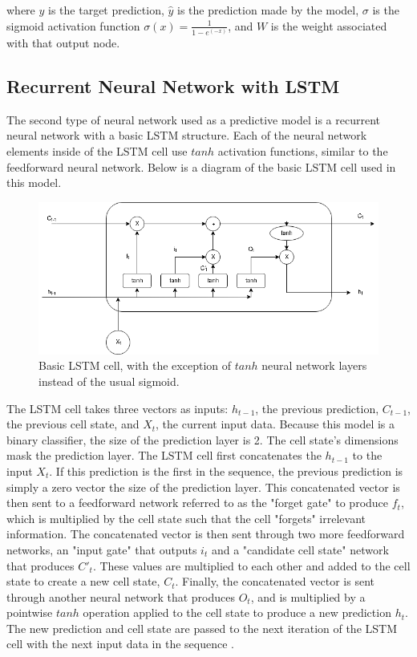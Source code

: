\documentclass{article}
\begin{document}
where $y$ is the target prediction, $\hat y$ is the prediction made by the model, $\sigma$ is the sigmoid activation function $\sigma(x) = \frac{1}{1-e^(-x)}$, and $W$ is the weight associated with that output node.
\subsection{Recurrent Neural Network with LSTM}
The second type of neural network used as a predictive model is a recurrent neural network with a basic LSTM structure. Each of the neural network elements inside of the LSTM cell use $tanh$ activation functions, similar to the feedforward neural network. Below is a diagram of the basic LSTM cell used in this model.
\begin{figure}[H]
	\label{fig:lstm}
	\includegraphics[width=\textwidth]{images/LSTMCell.png}
	\caption{Basic LSTM cell, with the exception of $tanh$ neural network layers instead of the usual sigmoid.}
\end{figure}
The LSTM cell takes three vectors as inputs: $h_{t-1}$, the previous prediction, $C_{t-1}$, the previous cell state, and $X_t$, the current input data. Because this model is a binary classifier, the size of the prediction layer is 2. The cell state's dimensions mask the prediction layer.
The LSTM cell first concatenates the $h_{t-1}$ to the input $X_t$. If this prediction is the first in the sequence, the previous prediction is simply a zero vector the size of the prediction layer.  This concatenated vector is then sent to a feedforward network referred to as the "forget gate" to produce $f_t$, which is multiplied by the cell state such that the cell "forgets" irrelevant information. The concatenated vector is then sent through two more feedforward networks, an "input gate" that outputs $i_t$ and a "candidate cell state" network that produces $C'_t$. These values are multiplied to each other and added to the cell state to create a new cell state, $C_t$. Finally, the concatenated vector is sent through another neural network that produces $O_t$, and is multiplied by a pointwise $tanh$ operation applied to the cell state to produce a new prediction $h_t$. The new prediction and cell state are passed to the next iteration of the LSTM cell with the next input data in the sequence \cite{lstm}.
\end{document}
